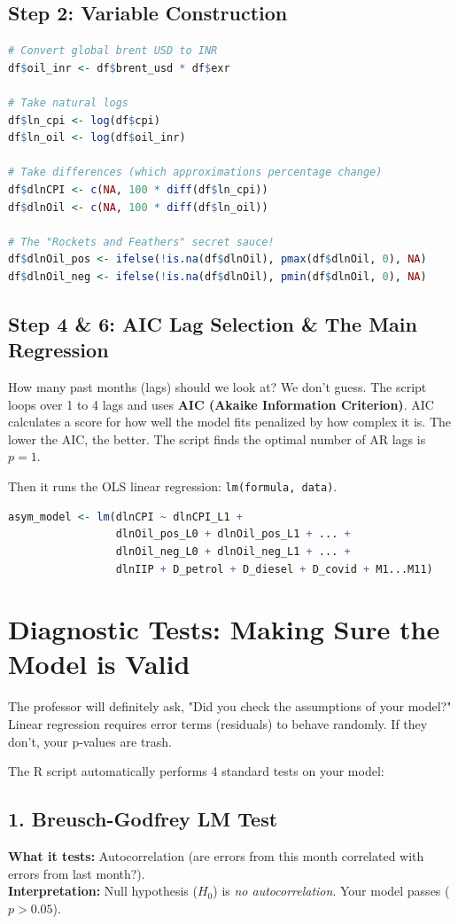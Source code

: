 \documentclass[12pt,a4paper]{report}
\begin{document}
\section{Step 2: Variable Construction}
\begin{lstlisting}[language=R]
# Convert global brent USD to INR
df$oil_inr <- df$brent_usd * df$exr

# Take natural logs
df$ln_cpi <- log(df$cpi)
df$ln_oil <- log(df$oil_inr)

# Take differences (which approximations percentage change)
df$dlnCPI <- c(NA, 100 * diff(df$ln_cpi))
df$dlnOil <- c(NA, 100 * diff(df$ln_oil))

# The "Rockets and Feathers" secret sauce!
df$dlnOil_pos <- ifelse(!is.na(df$dlnOil), pmax(df$dlnOil, 0), NA)
df$dlnOil_neg <- ifelse(!is.na(df$dlnOil), pmin(df$dlnOil, 0), NA)
\end{lstlisting}

\section{Step 4 \& 6: AIC Lag Selection & The Main Regression}
How many past months (lags) should we look at? We don't guess. The script loops over 1 to 4 lags and uses \textbf{AIC (Akaike Information Criterion)}. AIC calculates a score for how well the model fits penalized by how complex it is. The lower the AIC, the better. The script finds the optimal number of AR lags is $p=1$.

Then it runs the OLS linear regression: \texttt{lm(formula, data)}.
\begin{lstlisting}[language=R]
asym_model <- lm(dlnCPI ~ dlnCPI_L1 + 
                 dlnOil_pos_L0 + dlnOil_pos_L1 + ... +
                 dlnOil_neg_L0 + dlnOil_neg_L1 + ... +
                 dlnIIP + D_petrol + D_diesel + D_covid + M1...M11)
\end{lstlisting}

\newpage
\chapter{Diagnostic Tests: Making Sure the Model is Valid}
The professor will definitely ask, "Did you check the assumptions of your model?" Linear regression requires error terms (residuals) to behave randomly. If they don't, your p-values are trash. 

The R script automatically performs 4 standard tests on your model:

\section{1. Breusch-Godfrey LM Test}
\textbf{What it tests:} Autocorrelation (are errors from this month correlated with errors from last month?).\\
\textbf{Interpretation:} Null hypothesis ($H_0$) is \textit{no autocorrelation}. Your model passes ($p > 0.05$).
\end{document}
